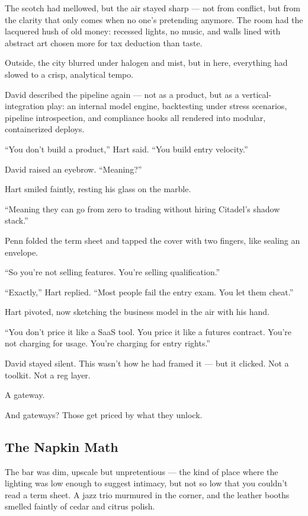 \medskip

The scotch had mellowed, but the air stayed sharp — not from conflict, but from the clarity that only comes when no one’s 
pretending anymore. The room had the lacquered hush of old money: recessed lights, no music, and walls lined with abstract 
art chosen more for tax deduction than taste.

Outside, the city blurred under halogen and mist, but in here, everything had slowed to a crisp, analytical tempo.

David described the pipeline again — not as a product, but as a vertical-integration play:  
an internal model engine, backtesting under stress scenarios, pipeline introspection, and compliance hooks all rendered 
into modular, containerized deploys.

“You don’t build a product,” Hart said. “You build entry velocity.”

David raised an eyebrow. “Meaning?”

Hart smiled faintly, resting his glass on the marble.

“Meaning they can go from zero to trading without hiring Citadel’s shadow stack.”

Penn folded the term sheet and tapped the cover with two fingers, like sealing an envelope.

“So you’re not selling features. You’re selling qualification.”

“Exactly,” Hart replied. “Most people fail the entry exam. You let them cheat.”

Hart pivoted, now sketching the business model in the air with his hand.

“You don’t price it like a SaaS tool. You price it like a futures contract.  
You’re not charging for usage. You’re charging for entry rights.”

David stayed silent. This wasn’t how he had framed it — but it clicked.  
Not a toolkit. Not a reg layer.

A gateway.

And gateways? Those get priced by what they unlock.



\subsection{The Napkin Math}

The bar was dim, upscale but unpretentious --- the kind of place where the lighting was low enough to suggest intimacy, 
but not so low that you couldn’t read a term sheet. A jazz trio murmured in the corner, and the leather booths smelled 
faintly of cedar and citrus polish.


